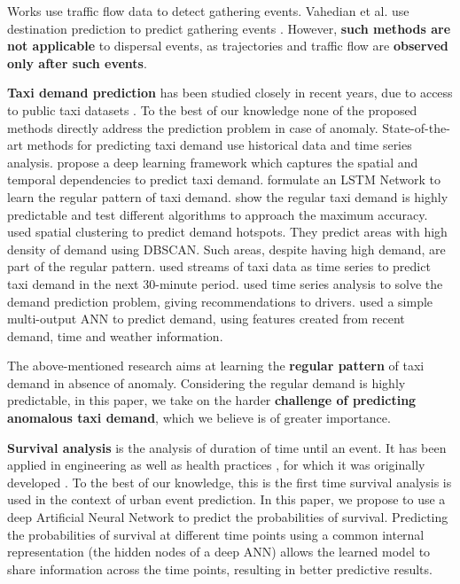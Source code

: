 \documentclass[letterpaper]{article} %
\begin{document}
Works \cite{zhou2016traffic,khezerlou2017traffic,hoang2016fccf} use traffic flow data to detect gathering events. Vahedian et al. use destination prediction to predict gathering events \cite{Vahedian2017forecasting}. However, \textbf{such methods are not applicable} to dispersal events, as trajectories and traffic flow are \textbf{observed only after such events}.

\textbf{Taxi demand prediction} has been studied closely in recent years, due to access to public taxi datasets \cite{zhao2016predicting}. To the best of our knowledge none of the proposed methods directly address the prediction problem in case of anomaly. State-of-the-art methods for predicting taxi demand use historical data and time series analysis. \cite{yao2018deep} propose a deep learning framework which captures the spatial and temporal dependencies to predict taxi demand. \cite{xu2017real} formulate an LSTM Network to learn the regular pattern of taxi demand. \cite{zhao2016predicting} show the regular taxi demand is highly predictable and test different algorithms to approach the maximum accuracy. \cite{zhang2016framework} used spatial clustering to predict demand hotspots. They predict areas with high density of demand using DBSCAN. Such areas, despite having high demand, are part of the regular pattern. \cite{moreira2013predicting} used streams of taxi data as time series to predict taxi demand in the next 30-minute period. \cite{davis2016multi} used time series analysis to solve the demand prediction problem, giving recommendations to drivers. \cite{mukai2012taxi} used a simple multi-output ANN to predict demand, using features created from recent demand, time and weather information.

The above-mentioned research aims at learning the \textbf{regular pattern} of taxi demand in absence of anomaly. Considering the regular demand is highly predictable, in this paper, we take on the harder \textbf{challenge of predicting anomalous taxi demand}, which we believe is of greater importance.

\textbf{Survival analysis} is the analysis of duration of time until an event. It has been applied in engineering as well as health practices \cite{street1998neural}, for which it was originally developed \cite{miller2011survival}. To the best of our knowledge, this is the first time survival analysis is used in the context of urban event prediction. In this paper, we propose to use a deep Artificial Neural Network to predict the probabilities of survival. Predicting the probabilities of survival at different time points using a common internal representation (the hidden nodes of a deep ANN) allows the learned model to share information across the time points, resulting in better predictive results.
\end{document}
